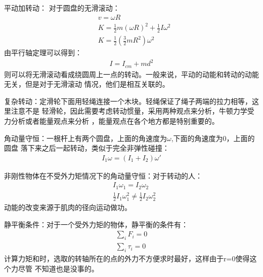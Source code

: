 \documentclass[UTF8]{article}
\numberwithin{equation}{section}
\begin{document}
平动加转动：
对于圆盘的无滑滚动：
\begin{align*}
    &v=\omega R\\
    &K=\frac{1}{2}m(\omega R)^2+\frac{1}{2}I\omega^2\\
    &K=\frac{1}{2}(\frac{3}{2}mR^2)\omega^2
\end{align*}
由平行轴定理可以得到：
\begin{align*}
    I=I_{cm}+md^2
\end{align*}
则可以将无滑滚动看成绕圆周上一点的转动。一般来说，平动的动能和转动的动能无关，但是对于无滑滚动
情况，他们是相互关联的。

复杂转动：定滑轮下面用轻绳连接一个木块。轻绳保证了绳子两端的拉力相等，这里注意不是
轻滑轮，因此需要考虑转动惯量，采用两种观点来分析，牛顿力学受力分析或者能量观点来分析
，能量观点在各个地方都是特别重要的。

角动量守恒：一根杆上有两个圆盘，上面的角速度为$\omega$,下面的角速度为0，上面的圆盘
落下来之后一起转动，类似于完全非弹性碰撞：
\begin{align*}
    I_1\omega = (I_1+I_2)\omega'
\end{align*}

非刚性物体在不受外力矩情况下的角动量守恒：对于转动的人：
\begin{align*}
    &I_1\omega_1=I_2\omega_2\\
    &\frac{1}{2}I_1\omega_1^2\neq \frac{1}{2}I_2\omega_2^2
\end{align*}
动能的改变来源于肌肉的径向运动做功。

静平衡条件：对于一个受外力矩的物体，静平衡的条件有：
\begin{align*}
    \sum_iF_i=0\\
    \sum_i \tau_i=0
\end{align*}
计算力矩和时，选取的转轴所在的点的外力不方便求时最好，这样由于r=0使得这个力尽管
不知道也是没事的。
\end{document}
